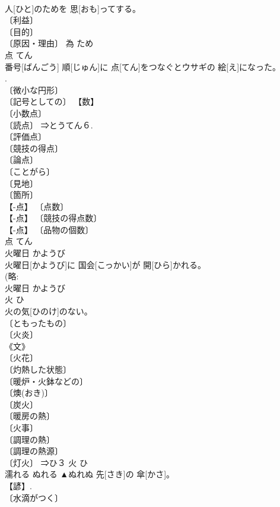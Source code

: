 \documentclass[8pt]{extreport}
\begin{document}
\begin{CJK}{UTF8}{min}
\\	人[ひと]のためを 思[おも]ってする。	
\\	〔利益〕 
\\	〔目的〕 
\\	〔原因・理由〕	為	ため	
\\	点	てん	
\\	番号[ばんごう] 順[じゅん]に 点[てん]をつなぐとウサギの 絵[え]になった。	
\\	[⇒点つなぎ].	
\\	〔微小な円形〕 
\\	〔記号としての〕 【数】 
\\	〔小数点〕 
\\	〔読点〕 ⇒とうてん６. 
\\	〔評価点〕 
\\	〔競技の得点〕 
\\	〔論点〕 
\\	〔ことがら〕 
\\	〔見地〕 
\\	〔箇所〕 
\\	【-点】 〔点数〕 
\\	【-点】 〔競技の得点数〕 
\\	【-点】 〔品物の個数〕 
\\	点	てん	
\\	火曜日	かようび	
\\	火曜日[かようび]に 国会[こっかい]が 開[ひら]かれる。	
\\	(略: 
\\	火曜日	かようび	
\\	火	ひ	
\\	火の気[ひのけ]のない。	
\\	〔ともったもの〕 
\\	〔火炎〕 
\\	《文》 
\\	〔火花〕 
\\	〔灼熱した状態〕 
\\	〔暖炉・火鉢などの〕 
\\	〔燠(おき)〕 
\\	〔炭火〕 
\\	〔暖房の熱〕 
\\	〔火事〕 
\\	〔調理の熱〕 
\\	〔調理の熱源〕 
\\	〔灯火〕 ⇒ひ３	火	ひ	
\\	濡れる	ぬれる	▲ぬれぬ 先[さき]の 傘[かさ]。	
\\	【諺】.	
\\	〔水滴がつく〕 

\end{CJK}
\end{document}
